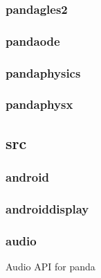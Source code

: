 \documentclass[a4paper]{article}
\begin{document}
\hypertarget{RefHeading20811167907073}{}\subsubsection{}
\clearpage\subsubsection[pandagles2]{pandagles2}
\hypertarget{RefHeading20831167907073}{}\subsubsection{}
\clearpage\subsubsection[pandaode]{pandaode}
\hypertarget{RefHeading20851167907073}{}\subsubsection{}
\clearpage\subsubsection[pandaphysics]{pandaphysics}
\hypertarget{RefHeading20871167907073}{}\subsubsection{}
\clearpage\subsubsection[pandaphysx]{pandaphysx}
\hypertarget{RefHeading20891167907073}{}\clearpage\subsection[src]{src}
\hypertarget{RefHeading20911167907073}{}\clearpage\subsubsection[android]{android}
\hypertarget{RefHeading20931167907073}{}\subsubsection{}
\clearpage\subsubsection[androiddisplay]{androiddisplay}
\hypertarget{RefHeading20951167907073}{}\subsubsection{}
\clearpage\subsubsection[audio]{audio}
\hypertarget{RefHeading20971167907073}{}{\color{black}
Audio API for panda}
\end{document}
